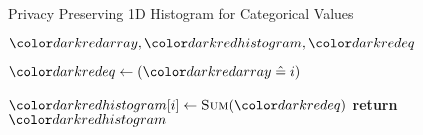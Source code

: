 \begin{algorithm}[H]
\caption{Privacy Preserving 1D Histogram for Categorical Values}\label{a:1d-histogram-categorical}
\begin{algorithmic}[1]
\renewcommand{\algorithmicrequire}{\textbf{Private Vars:}}
\Require $\red{array}, \red{histogram}, \red{eq}$

        \State $\red{eq} \gets (\red{array} \heq i)$

        \State $\red{histogram}[i] \gets
        \textsc{Sum}(\red{eq})$
    \EndFor
    \State \textbf{return} {$\red{histogram}$}
\EndProcedure

\begin{spacing}{0.5}
\end{spacing}


\end{algorithmic}
\end{algorithm}

